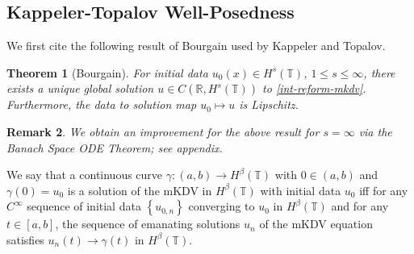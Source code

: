 \documentclass[12pt,reqno]{amsart}
\numberwithin{equation}{section}  %
\newcommand{\rr}{\mathbb{R}}
\newcommand{\ci}{\mathbb{T}}
\newtheorem{theorem}{Theorem}[section]
\newtheorem{remark}[theorem]{Remark}
\begin{document}
  \subsection{Kappeler-Topalov \cite{Kappeler:2006uq} Well-Posedness} 
  \label{ssec:kap-wp}
  We first cite the following result of Bourgain \cite{Bourgain-Fourier-transfo} used
  by Kappeler and Topalov.
  \begin{theorem}[Bourgain]
    For initial data $u_{0}(x) \in H^{s}(\ci)$, $1\le s \le \infty$, 
    there exists a unique global solution $u \in C(\rr, H^{s}(\ci))$ to
    \eqref{int-reform-mkdv}. Furthermore, the data to solution map $u_{0}
    \mapsto u$ is Lipschitz.
    \label{thm:bour}
  \end{theorem}
  \begin{framed}
  \begin{remark}
  We obtain an improvement for the above result for $s = \infty$ via the Banach
  Space ODE Theorem; see appendix.
  \label{rem:ode-thm}
  \end{remark}
  \end{framed}
  We say that a continuous curve $\gamma: (a,b) \to H^{\beta}(\ci)$ with $0 \in
  (a,b)$ and $\gamma(0) = u_{0}$ is a solution of the mKDV in
  $H^{\beta}(\ci)$ with initial data $u_{0}$ iff for any $C^{\infty}$ sequence
  of initial data $\left\{ u_{0,n} \right\}$ converging to $u_{0}$ in
  $H^{\beta}(\ci)$ and for any $t \in [a,b]$, the sequence of emanating
  solutions $u_{n}$ of the mKDV equation satisfies $u_{n}(t) \to
  \gamma(t)$ in $H^{\beta}(\ci)$.
\end{document}
